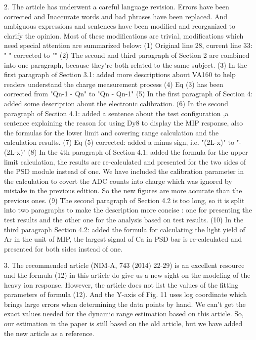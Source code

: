 \documentclass[]{article}
\begin{document}
2. The article has underwent a careful language revision. Errors have been corrected and Inaccurate words and bad phrases have been replaced.  And ambiguous expressions and sentences have been modified and reorganized to clarify the opinion. 
Most of these modifications are trivial, modifications which need special attention are summarized below:
     (1) Original line 28, current line 33:  "  " corrected to "\beta{}"
     (2) The second and third paragraph of Section 2 are combined into one paragraph, because they're both related to the same subject.
     (3) In the first paragraph of Section 3.1: added more descriptions about VA160 to help readers understand the charge measurement process
     (4) Eq (3) has been corrected from "Qn-1 - Qn" to "Qn - Qn-1"
     (5) In the first paragraph of Section 4: added some description about the electronic calibration.
     (6) In the second paragraph of Section 4.1: added a sentence about the test configuration ,a sentence explaining the reason for using Dy8 to display the MIP response, also the formulas for the lower limit and covering range calculation and the calculation results.
     (7) Eq (5) corrected: added a minus sign, i.e. "(2L-x)" to "-(2L-x)"
     (8) In the 4th paragraph of Section 4.1: added the formula for the upper limit calculation, the results are re-calculated and presented for the two sides of the PSD module instead of one. We have included the calibration parameter in the calculation to covert the ADC counts into charge which was ignored by mistake in the previous edition. So the new figures are more accurate than the previous ones.
     (9) The second paragraph of Section 4.2 is too long, so it is split into two paragraphs to make the description more concise : one for presenting the test results and the other one for the analysis based on test results.  
     (10) In the third paragraph Section 4.2: added the formula for calculating the light yield of Ar in the unit of MIP, the largest signal of Ca in PSD bar is re-calculated and  presented for both sides instead of one.
      

3. The recommended article (NIM-A, 743 (2014) 22-29) is an excellent resource and the formula (12) in this article do give us a new sight on the modeling of the heavy ion response. However, the article does not list the values of the fitting parameters of formula (12). And the Y-axis of Fig. 11 uses log coordinate which brings large errors when determining the data points by hand. We can't get the exact values needed for the dynamic range estimation based on this article. So, our estimation in the paper is still based on the old article, but we have added the new article as a reference.
\end{document}
